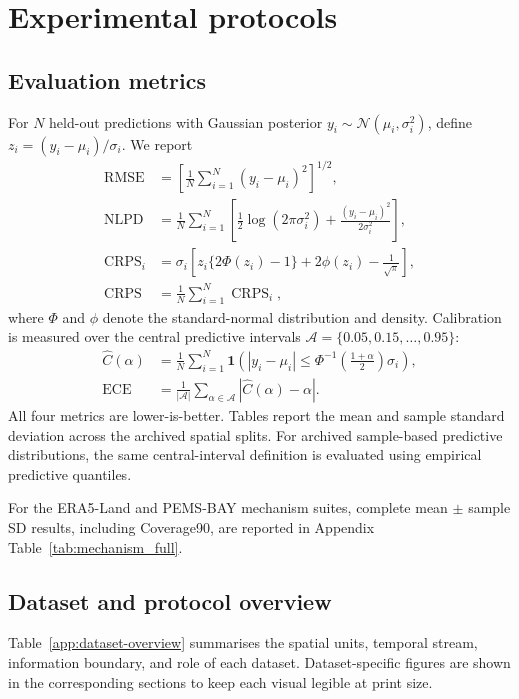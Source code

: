 \section{Experimental protocols}

\subsection{Evaluation metrics}

For $N$ held-out predictions with Gaussian posterior
$y_i\sim\mathcal N(\mu_i,\sigma_i^2)$, define
$z_i=(y_i-\mu_i)/\sigma_i$.  We report
\begin{align}
\operatorname{RMSE}
&=\left[\frac{1}{N}\sum_{i=1}^{N}(y_i-\mu_i)^2\right]^{1/2},
\\
\operatorname{NLPD}
&=\frac{1}{N}\sum_{i=1}^{N}
\left[\frac{1}{2}\log(2\pi\sigma_i^2)
+\frac{(y_i-\mu_i)^2}{2\sigma_i^2}\right],
\\
\operatorname{CRPS}_i
&=\sigma_i\left[z_i\{2\Phi(z_i)-1\}
+2\phi(z_i)-\frac{1}{\sqrt{\pi}}\right],
\\
\operatorname{CRPS}
&=\frac{1}{N}\sum_{i=1}^{N}\operatorname{CRPS}_i,
\end{align}
where $\Phi$ and $\phi$ denote the standard-normal distribution and density.
Calibration is measured over the central predictive intervals
$\mathcal A=\{0.05,0.15,\ldots,0.95\}$:
\begin{align}
\widehat C(\alpha)
&=\frac{1}{N}\sum_{i=1}^{N}
\mathbf{1}\!\left(
|y_i-\mu_i|\leq
\Phi^{-1}\!\left(\frac{1+\alpha}{2}\right)\sigma_i
\right),
\\
\operatorname{ECE}
&=\frac{1}{|\mathcal A|}\sum_{\alpha\in\mathcal A}
|\widehat C(\alpha)-\alpha|.
\end{align}
All four metrics are lower-is-better.  Tables report the mean and sample
standard deviation across the archived spatial splits.  For archived
sample-based predictive distributions, the same central-interval definition
is evaluated using empirical predictive quantiles.

For the ERA5-Land and PEMS-BAY mechanism suites, complete mean $\pm$ sample
SD results, including Coverage90, are reported in Appendix Table~\ref{tab:mechanism_full}.

\FloatBarrier
\subsection{Dataset and protocol overview}

Table~\ref{app:dataset-overview} summarises the spatial units, temporal stream,
information boundary, and role of each dataset. Dataset-specific figures are
shown in the corresponding sections to keep each visual legible at print size.

